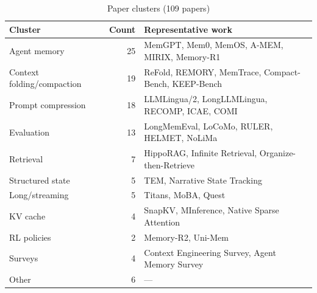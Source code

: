 \documentclass[11pt,a4paper]{article}
\begin{document}
\begin{table}[htbp]
\centering
\caption{Paper clusters (109 papers)}
\begin{tabular}{lrl}
\toprule
Cluster & Count & Representative work \\
\midrule
Agent memory & 25 & MemGPT, Mem0, MemOS, A-MEM, MIRIX, Memory-R1 \\
Context folding/compaction & 19 & ReFold, REMORY, MemTrace, Compact-Bench, KEEP-Bench \\
Prompt compression & 18 & LLMLingua/2, LongLLMLingua, RECOMP, ICAE, COMI \\
Evaluation & 13 & LongMemEval, LoCoMo, RULER, HELMET, NoLiMa \\
Retrieval & 7 & HippoRAG, Infinite Retrieval, Organize-then-Retrieve \\
Structured state & 5 & TEM, Narrative State Tracking \\
Long/streaming & 5 & Titans, MoBA, Quest \\
KV cache & 4 & SnapKV, MInference, Native Sparse Attention \\
RL policies & 2 & Memory-R2, Uni-Mem \\
Surveys & 4 & Context Engineering Survey, Agent Memory Survey \\
Other & 6 & --- \\
\bottomrule
\end{tabular}
\end{table}
\end{document}

